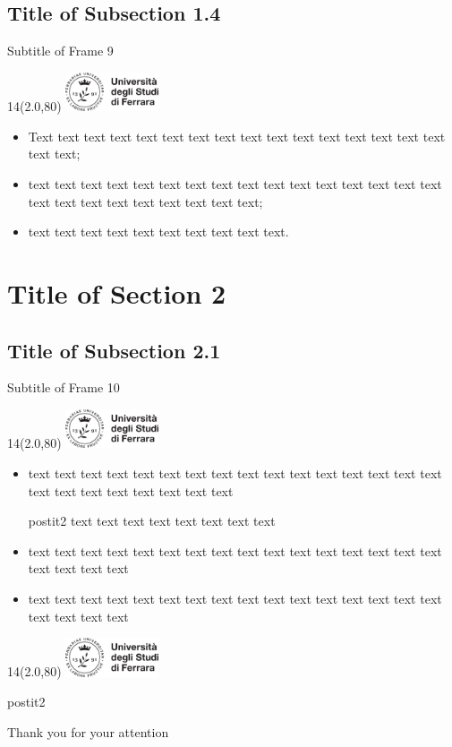 \documentclass[11pt,xcolor={dvipsnames},default]{beamer} %
\newcommand{\MyLogo}{%
\begin{textblock}{14}(2.0,80)
 \includegraphics[height=1.15cm, angle=0]{logo}
\end{textblock}
}
\begin{document}
\subsection{Title of Subsection 1.4}
\begin{frame}{Subtitle of Frame 9}
\transdissolve
\MyLogo
\begin{itemize}
\item<1-> Text text text text text text text text text text text text text text text text text text;
\item<2-> text text text text text text text text text text text text text text text text text text text text text text text text text;
\item<3-> text text text text text text text text text text.
\end{itemize}
\end{frame}


\section{Title of Section 2}

\subsection{Title of Subsection 2.1}
\begin{frame}{Subtitle of Frame 10}
\transboxin
\MyLogo
\begin{itemize}
\item<1-> text text text text text text text text text text text text text text text text text text text text text text text text
\begin{beamercolorbox}[center, shadow=false, rounded=true]{postit2}
text text text text text text text text 
\end{beamercolorbox}
\item<2->  text text text text text text text text text text text text text text text text text text text text
\item<3->  text text text text text text text text text text text text text text text text text text text text
\end{itemize}
\end{frame}

%
%


\begin{frame}
\transboxin
\MyLogo
\vspace{1.0cm}
\begin{beamercolorbox}[sep=1.0cm, center, shadow=false, rounded=true]{postit2}
\begin{Huge}Thank you for your attention\end{Huge}
\end{beamercolorbox}
\pause
\end{frame}

\fi
\end{document}
